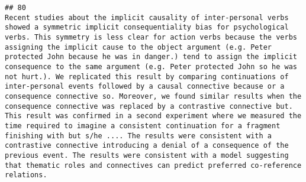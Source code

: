 \documentclass[
  english,
  man]{apa6}
\begin{document}
\begin{verbatim}
## 80                                                                                                                                                                                                                                                                                                                                                                                                                                                                                                                                                                                                                                                                                                                                                                                                                                                                                                                                                                                                                                                                                                                                                                                                                                                                                                                                                                                                                                                                                                                           Recent studies about the implicit causality of inter-personal verbs showed a symmetric implicit consequentiality bias for psychological verbs. This symmetry is less clear for action verbs because the verbs assigning the implicit cause to the object argument (e.g. Peter protected John because he was in danger.) tend to assign the implicit consequence to the same argument (e.g. Peter protected John so he was not hurt.). We replicated this result by comparing continuations of inter-personal events followed by a causal connective because or a consequence connective so. Moreover, we found similar results when the consequence connective was replaced by a contrastive connective but. This result was confirmed in a second experiment where we measured the time required to imagine a consistent continuation for a fragment finishing with but s/he .... The results were consistent with a contrastive connective introducing a denial of a consequence of the previous event. The results were consistent with a model suggesting that thematic roles and connectives can predict preferred co-reference relations.

\end{verbatim}
\end{document}
